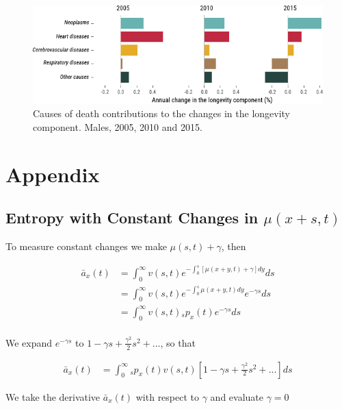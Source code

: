 \documentclass[12pt]{article}
\begin{document}
\begin{figure}[!ht]
	\centering
	\includegraphics[width=1\linewidth]{Fig/DescCod}
	\caption{{Causes of death contributions to the changes in the longevity component. Males, 2005, 2010 and 2015.}}
	\label{fig:Fig7}
\end{figure}


\FloatBarrier
\newpage
\appendix
\section{Appendix}

\subsection{Entropy with Constant Changes in $\mu(x+s,t)$}\label{sec:EntropyConst}

To measure constant changes we make $\mu(s,t)+\gamma$, then

\begin{equation}\label{eq:EntropyConst1}
\begin{split}
\bar{a}_{x}(t) &= \int_0^\infty{v}(s,t) e^{-\int_{0}^{s} [\mu(x+y,t)+\gamma]dy}ds \\
&= \int_0^\infty {v}(s,t)e^{-\int_{0}^{s} \mu(x+y,t)dy} e^{-\gamma s}ds \\
&= \int_0^\infty {v}(s,t){}_sp_x(t) e^{-\gamma s}ds \\
\end{split}
\end{equation}

We expand $e^{-\gamma s}$ to $1-\gamma s+\frac{\gamma^2}{2} s^{2} +...$, so that


\begin{equation}\label{eq:EntropyConst2}
\begin{split}
\bar{a}_{x}(t) &= \int_0^\infty {}_sp_x(t) {v}(s,t)[1-\gamma s+\frac{\gamma^2}{2} s^{2} +...]ds
\end{split}
\end{equation}

We take the derivative $\bar{a}_{x}(t)$ with respect to $\gamma$ and evaluate $\gamma=0$
\end{document}
